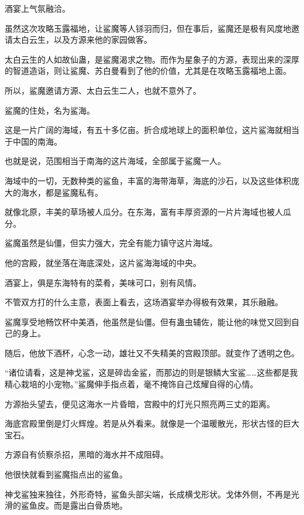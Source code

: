 
\begin{this_body}



酒宴上气氛融洽。

虽然这次攻略玉露福地，让鲨魔等人铩羽而归，但在事后，鲨魔还是极有风度地邀请太白云生，以及方源来他的家园做客。

太白云生的人如故仙蛊，是鲨魔渴求之物。而作为星象子的方源，表现出来的深厚的智道造诣，则让鲨魔、苏白曼看到了他的价值，尤其是在攻略玉露福地上面。

所以，鲨魔邀请方源、太白云生二人，也就不意外了。

鲨魔的住处，名为鲨海。

这是一片广阔的海域，有五十多亿亩。折合成地球上的面积单位，这片鲨海就相当于中国的南海。

也就是说，范围相当于南海的这片海域，全部属于鲨魔一人。

海域中的一切，无数种类的鲨鱼，丰富的海带海草，海底的沙石，以及这些体积庞大的海水，都是鲨魔私有。

就像北原，丰美的草场被人瓜分。在东海，富有丰厚资源的一片片海域也被人瓜分。

鲨魔虽然是仙僵，但实力强大，完全有能力镇守这片海域。

他的宫殿，就坐落在海底深处，这片鲨海海域的中央。

酒宴上，俱是东海特有的菜肴，美味可口，别有风情。

不管双方打的什么主意，表面上看去，这场酒宴举办得极有效果，其乐融融。

鲨魔享受地畅饮杯中美酒，他虽然是仙僵。但有蛊虫辅佐，能让他的味觉又回到自己的身上。

随后，他放下酒杯，心念一动，雄壮又不失精美的宫殿顶部。就变作了透明之色。

“诸位请看，这是神戈鲨，这是碎齿金鲨，而那边的则是银鳞大宝鲨……这些都是我精心栽培的小宠物。”鲨魔伸手指点着，毫不掩饰自己炫耀自得的心情。

方源抬头望去，便见这海水一片昏暗，宫殿中的灯光只照亮两三丈的距离。

海底宫殿里倒是灯火辉煌。若是从外看来。就像是一个温暖散光，形状古怪的巨大宝石。

方源自有侦察杀招，黑暗的海水并不成阻碍。

他很快就看到鲨魔指点出的鲨鱼。

神戈鲨独来独往，外形奇特，鲨鱼头部尖端，长成横戈形状。戈体外侧，不再是光滑的鲨鱼皮。而是露出白骨质地。


\end{this_body}
